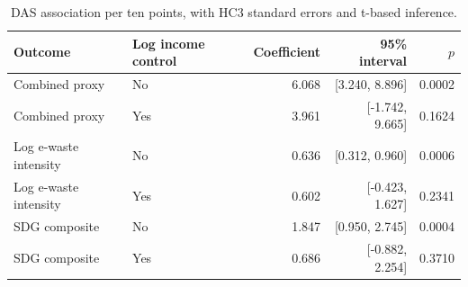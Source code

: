 \begin{table}[htbp]\centering\small
\caption{DAS association per ten points, with HC3 standard errors and t-based inference.}\label{tab:regression}
\begin{tabular}{llrrr}\toprule Outcome & Log income control & Coefficient & 95\% interval & $p$ \\ \midrule
Combined proxy & No & 6.068 & [3.240, 8.896] & 0.0002 \\
Combined proxy & Yes & 3.961 & [-1.742, 9.665] & 0.1624 \\
Log e-waste intensity & No & 0.636 & [0.312, 0.960] & 0.0006 \\
Log e-waste intensity & Yes & 0.602 & [-0.423, 1.627] & 0.2341 \\
SDG composite & No & 1.847 & [0.950, 2.745] & 0.0004 \\
SDG composite & Yes & 0.686 & [-0.882, 2.254] & 0.3710 \\
\bottomrule\end{tabular}\end{table}
